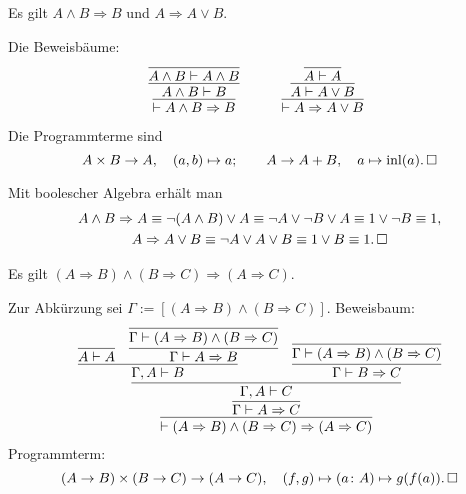 \begin{Satz}\label{from-conj}
Es gilt $A\land B\Rightarrow B$ und $A\Rightarrow A\lor B$.
\end{Satz}
\begin{Beweis}[Beweis 1]
Die Beweisbäume:
\[
\begin{array}{@{}l@{\qquad\quad}l}
\infer{\vdash A\land B\Rightarrow B}{
  \infer{A\land B\vdash B}{
    \infer{A\land B\vdash A\land B}{}}}
&
\infer{\vdash A\Rightarrow A\lor B}{
  \infer{A\vdash A\lor B}{
    \infer{A\vdash A}{}}}
\end{array}
\]
Die Programmterme sind
\[
A\times B\to A,\quad (a,b)\mapsto a;\qquad
A\to A+B,\quad a\mapsto\operatorname{inl}(a).\,\square\]
\end{Beweis}
\begin{Beweis}
Mit boolescher Algebra erhält man
\begin{gather*}
A\land B\Rightarrow A\equiv \neg(A\land B)\lor A
\equiv \neg A\lor\neg B\lor A
\equiv 1\lor\neg B\equiv 1,\\
A\Rightarrow A\lor B\equiv \neg A\lor A\lor B
\equiv 1\lor B\equiv 1.\,\square
\end{gather*}
\end{Beweis}

\newpage

\begin{Satz}\newlinefirst
Es gilt
$(A\Rightarrow B) \land (B\Rightarrow C) \Rightarrow (A\Rightarrow C)$.
\end{Satz}
\begin{Beweis}[Beweis]
Zur Abkürzung sei $\Gamma:=[(A\Rightarrow B) \land (B\Rightarrow C)]$.
Beweisbaum:
\[
\infer{\vdash (A\Rightarrow B) \land (B\Rightarrow C) \Rightarrow (A\Rightarrow C)}{
  \infer{\Gamma\vdash A\Rightarrow C}{
    \infer{\Gamma,A\vdash C}{
     \infer{\Gamma,A\vdash B}{\infer{A\vdash A}{}
     & \infer{\Gamma\vdash A\Rightarrow B}{
         \infer{\Gamma\vdash (A\Rightarrow B)\land (B\Rightarrow C)}{}}}
     & \infer{\Gamma\vdash B\Rightarrow C}{
         \infer{\Gamma\vdash (A\Rightarrow B)\land (B\Rightarrow C)}{}}}}}
\]
Programmterm:
\[(A\to B)\times (B\to C)\to (A\to C),\quad
(f, g)\mapsto (a\colon A)\mapsto g(f(a)).\,\square\]
\end{Beweis}

